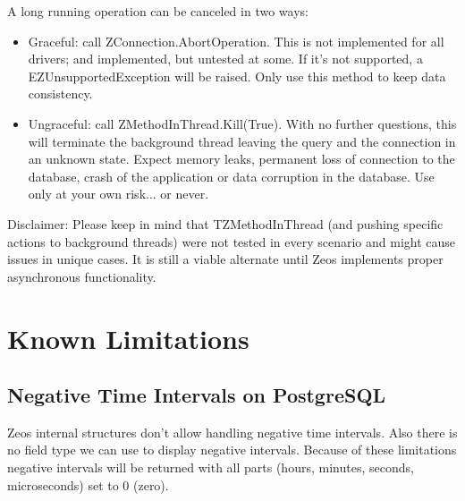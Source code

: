 \documentclass[a4paper,12pt,oneside]{article}
\begin{document}
A long running operation can be canceled in two ways:
\begin{itemize}
  \item 
	  Graceful: call ZConnection.AbortOperation.
    This is not implemented for all drivers; and implemented, but untested at some.
		If it's not supported, a EZUnsupportedException will be raised.
		Only use this method to keep data consistency.
  \item
	  Ungraceful: call ZMethodInThread.Kill(True).
    With no further questions, this will terminate the background thread leaving the query and the connection in an unknown state.
		Expect memory leaks, permanent loss of connection to the database, crash of the application or data corruption in the database.
		Use only at your own risk... or never.
\end{itemize}

Disclaimer:
Please keep in mind that TZMethodInThread (and pushing specific actions to background threads) were not tested in every scenario and might cause issues in unique cases.
It is still a viable alternate until Zeos implements proper asynchronous functionality.

\section{Known Limitations}

\subsection{Negative Time Intervals on PostgreSQL}
Zeos internal structures don't allow handling negative time intervals.
Also there is no field type we can use to display negative intervals.
Because of these limitations negative intervals will be returned with all parts (hours, minutes, seconds, microseconds) set to 0 (zero).
\end{document}
